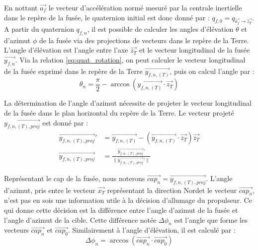 En nottant $\overrightarrow{a_f}$ le vecteur d'accélération normé mesuré par la centrale inertielle dans le repère de la fusée,
le quaternion initial est donc donné par : $q_{f,0} = q_{\overrightarrow{a_f} \rightarrow \overrightarrow{z_T}}$.\\

A partir du quaternion $q_{f,n}$, il est possible de calculer les angles d'élévation $\theta$ et d'azimut $\phi$ de la fusée via
des projections de vecteurs dans le repère de la Terre. L'angle d'élévation est l'angle entre l'axe $\overrightarrow{z_T}$ et le
vecteur longitudinal de la fusée $\overrightarrow{y_{f,n}}$. Via la relation \ref{eq:quat_rotation}, on peut calculer le vecteur
longitudinal de la fusée exprimé dans le repère de la Terre $\overrightarrow{y_{f,n,(T)}}$, puis on calcul l'angle par :
\begin{equation}
	\theta_{n} = \frac{\pi}{2} - \arccos\left(\overrightarrow{y_{f,n,(T)}} \cdot \overrightarrow{z_T}\right)
\end{equation}

La détermination de l'angle d'azimut nécessite de projeter le vecteur longitudinal de la fusée dans le plan horizontal du repère
de la Terre. Le vecteur projeté $\overrightarrow{y_{f,n,(T),proj}}$ est donné par :
\begin{align}
	\overrightarrow{y_{f,n,(T),proj}}' &= \overrightarrow{y_{f,n,(T)}} - \left(\overrightarrow{y_{f,n,(T)}} \cdot \overrightarrow{z_T}\right) \overrightarrow{z_T} \\
	\overrightarrow{y_{f,n,(T),proj}} &= \frac{\overrightarrow{y_{f,n,(T),proj}}'}{\|\overrightarrow{y_{f,n,(T),proj}}'\|}
\end{align}

Représentant le cap de la fusée, nous noterons $\overrightarrow{cap_n} = \overrightarrow{y_{f,n,(T),proj}}$. L'angle d'azimut,
pris entre le vecteur $\overrightarrow{x_T}$ représentant la direction Nordet le vecteur $\overrightarrow{cap_n}$, n'est pas en
sois une information utile à la décision d'allumage du propulseur. Ce qui donne cette décision est la différence entre l'angle
d'azimut de la fusée et l'angle d'azimut de la cible. Cette différence notée $\Delta \phi_n$ est l'angle que forme les vecteurs
$\overrightarrow{cap_n}$ et $\overrightarrow{cap_0}$. Similairement à l'angle d'élévation, il est calculé par :
\begin{equation}
	\Delta \phi_n = \arccos\left(\overrightarrow{cap_n} \cdot \overrightarrow{cap_0}\right)
\end{equation}

